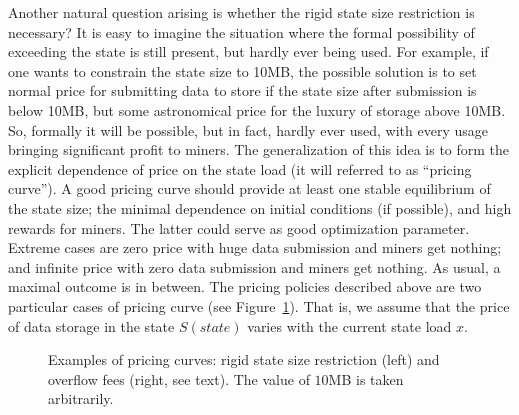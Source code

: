 \documentclass[]{llncs}   %
\begin{document}
Another natural question arising is whether the rigid state size restriction is
necessary?  It is easy to imagine the situation where the formal possibility of
exceeding the state is still present, but hardly ever being used. For example,
if one wants to constrain the state size to 10MB, the possible solution is to
set normal price for submitting data to store if the state size after submission
is below 10MB, but some astronomical price for the luxury of storage above 10MB.
So, formally it will be possible, but in fact, hardly ever used, with every
usage bringing significant profit to miners. The generalization of this idea is
to form the explicit dependence of price on the state load (it will referred to
as ``pricing curve''). A good pricing curve should provide at least one stable
equilibrium of the state size; the minimal dependence on initial conditions (if
possible), and high rewards for miners. The latter could serve as good
optimization parameter. Extreme cases are zero price with huge data submission and
miners get nothing; and infinite price with zero data submission and miners get
nothing. As usual, a maximal outcome is in between.  The pricing policies
described above are two particular cases of pricing curve (see
Figure~\ref{fig:steps}). That is, we assume that the price of data storage in the
state $S(state)$ varies with the current state load $x$. 
\begin{figure}[h]
    \hfill 
    \hfill 
    \hfill 
    \caption{ 
        Examples of pricing curves: rigid state size restriction (left) and 
        overflow fees (right, see text). The value of $10$MB is taken 
        arbitrarily.  
    } 
    \label{fig:steps}
\end{figure} 
\end{document}
